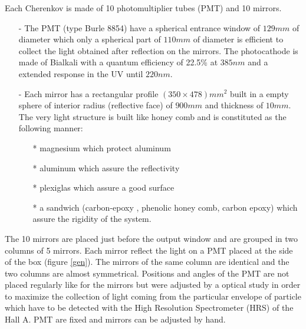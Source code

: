 \documentclass[12pt]{article}
\begin{document}
Each Cherenkov is made of 10 photomultiplier tubes (PMT) and 10 mirrors.
\begin{itemize}
\item[-] The PMT (type Burle 8854) have a spherical entrance window of
$129mm$ of diameter which only a spherical part of $110mm$ of diameter is
efficient to collect the light obtained after reflection on the mirrors. 
The photocathode is made of Bialkali with a quantum efficiency of 22.5\% 
at $385nm$ and a extended response in the UV until $220 nm$.
\item[-] Each mirror has a rectangular profile $(350 \times 478) mm^2$
built in a empty sphere of interior radius (reflective face) 
of $900mm$ and thickness of $10mm$. The very light structure is built
like honey comb and is constituted as the following manner:
\begin{itemize}
\item[*] magnesium which protect aluminum
\item[*] aluminum which assure the reflectivity
\item[*] plexiglas which assure a good surface 
\item[*] a sandwich (carbon-epoxy , phenolic honey comb, carbon epoxy) which
assure the rigidity of the system.
\end{itemize}
\end{itemize}
The 10 mirrors are placed just before the output window and are grouped in
two columns of 5 mirrors. Each mirror reflect the light on a PMT placed at the
side of the box (figure \ref{gen}). The mirrors of the same column are
identical and the two
columns are almost symmetrical. Positions and angles of the PMT are not placed
regularly like for the mirrors but were adjusted by a optical study in order to
maximize the collection of light coming from the particular envelope of
particle which have to be detected with the High Resolution Spectrometer
(HRS) of the Hall A. PMT are fixed and mirrors can
be adjusted by hand.
\end{document}
